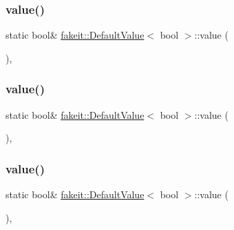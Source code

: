 \subsubsection{\texorpdfstring{value()}{value()}\hspace{0.1cm}{\footnotesize\ttfamily [1/9]}}
{\footnotesize\ttfamily static bool\& \mbox{\hyperlink{structfakeit_1_1DefaultValue}{fakeit\+::\+Default\+Value}}$<$ bool $>$\+::value (\begin{DoxyParamCaption}{ }\end{DoxyParamCaption})\hspace{0.3cm}{\ttfamily [inline]}, {\ttfamily [static]}}

\mbox{\label{structfakeit_1_1DefaultValue_3_01bool_01_4_a75acaf4263452b9ee596cbedda0c7ee1}} 
\subsubsection{\texorpdfstring{value()}{value()}\hspace{0.1cm}{\footnotesize\ttfamily [2/9]}}
{\footnotesize\ttfamily static bool\& \mbox{\hyperlink{structfakeit_1_1DefaultValue}{fakeit\+::\+Default\+Value}}$<$ bool $>$\+::value (\begin{DoxyParamCaption}{ }\end{DoxyParamCaption})\hspace{0.3cm}{\ttfamily [inline]}, {\ttfamily [static]}}

\mbox{\label{structfakeit_1_1DefaultValue_3_01bool_01_4_a75acaf4263452b9ee596cbedda0c7ee1}} 
\subsubsection{\texorpdfstring{value()}{value()}\hspace{0.1cm}{\footnotesize\ttfamily [3/9]}}
{\footnotesize\ttfamily static bool\& \mbox{\hyperlink{structfakeit_1_1DefaultValue}{fakeit\+::\+Default\+Value}}$<$ bool $>$\+::value (\begin{DoxyParamCaption}{ }\end{DoxyParamCaption})\hspace{0.3cm}{\ttfamily [inline]}, {\ttfamily [static]}}

